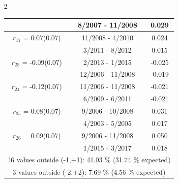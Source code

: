 \begin{multicols}{2}
{\begin{tabular}{ccc}
&        8/2007 - 11/2008 &        0.029  \vspace{-.02in} \\ \hline 
  $r_{17}$ = 0.07(0.07) &      11/2008 -  4/2010 &        0.024   \vspace{-.10in} \\  
&        3/2011 -  8/2012 &        0.015  \vspace{-.02in} \\ \hline 
  $r_{23}$ = -0.09(0.07) &       2/2013 -  1/2015 &       -0.025    \vspace{-.10in} \\ 
  &       12/2006 - 11/2008 &       -0.019  \vspace{-.02in}   \\ \hline 
    $r_{24}$ = -0.12(0.07) &      11/2006 - 11/2008 &       -0.021    \vspace{-.10in} \\ 
  &        6/2009 -  6/2011 &       -0.021  \vspace{-.02in}   \\ \hline 
    $r_{25}$ = 0.08(0.07) &       9/2006 - 10/2008 &        0.031   \vspace{-.10in} \\  
&        4/2003 -  5/2005 &        0.017  \vspace{-.02in} \\ \hline 
  $r_{26}$ = 0.09(0.07) &       9/2006 - 11/2008 &        0.050   \vspace{-.10in} \\  
&        1/2015 -  3/2017 &        0.018  \vspace{-.02in} \\ \hline 
\multicolumn{3}{c}{              16 values outside (-1,+1): 41.03  \% (31.74  \% expected)}\vspace{-.10in} \\ 
\multicolumn{3}{c}{               3 values outside (-2,+2):  7.69 \%  (4.56 \% expected) } \\
 \end{tabular} \\ 
 } 
\end{multicols} 
